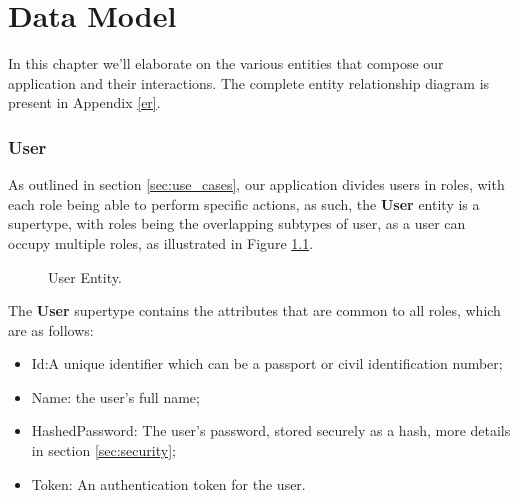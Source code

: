 %
%
\chapter{Data Model}\label{cap:data_model}
In this chapter we'll elaborate on the various entities that compose our application and their interactions.
The complete entity relationship diagram is present in Appendix \ref{er}.

\subsection{User}

As outlined in section \ref{sec:use_cases}, our application divides users in roles, with each role being able to perform specific actions, as such, the \textbf{User} entity is a supertype, with roles being the overlapping subtypes of user, as a user can occupy multiple roles, as illustrated in Figure \ref{fig:user_entity}.

\begin{figure}[h]
	\begin{center}
	\end{center}
	\caption{User Entity.}\label{fig:user_entity}
\end{figure}

The \textbf{User} supertype contains the attributes that are common to all roles, which are as follows:

\begin{itemize}
	\item Id:A unique identifier which can be a passport or civil identification number;
	\item Name: the user's full name;
	\item HashedPassword: The user's password, stored securely as a hash, more details in section \ref{sec:security};
	\item Token: An authentication token for the user.
\end{itemize}

